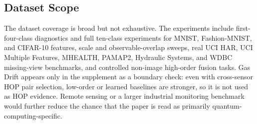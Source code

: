 \subsection{Dataset Scope}

The dataset coverage is broad but not exhaustive. The experiments include first-four-class diagnostics and full ten-class experiments for MNIST, Fashion-MNIST, and CIFAR-10 features, scale and observable-overlap sweeps, real UCI HAR, UCI Multiple Features, MHEALTH, PAMAP2, Hydraulic Systems, and WDBC missing-view benchmarks, and controlled non-image high-order fusion tasks. Gas Drift appears only in the supplement as a boundary check: even with cross-sensor HOP pair selection, low-order or learned baselines are stronger, so it is not used as HOP evidence. Remote sensing or a larger industrial monitoring benchmark would further reduce the chance that the paper is read as primarily quantum-computing-specific.
